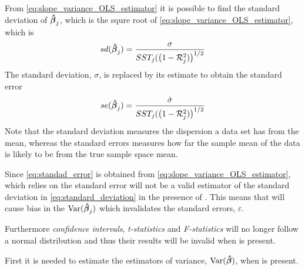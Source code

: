 From \eqref{eq:slope_variance_OLS_estimator} it is possible to find the standard deviation of $\operatorname{\boldsymbol{\hat{\beta}}}_j$, which is the squre root of \ref{eq:slope_variance_OLS_estimator}, which is
\begin{align}\label{eq:standard_deviation}
    sd(\operatorname{\boldsymbol{\hat{\beta}}}_j) = \dfrac{\sigma}{SST_j(\big(1- \mathcal{R}_j^2)\big)^{1/2}}
\end{align}
The standard deviation, $\sigma$, is replaced by its estimate to obtain the standard error
\begin{align}\label{eq:standad_error}
    se(\operatorname{\boldsymbol{\hat{\beta}}}_j) = \dfrac{\hat{\sigma}}{SST_j(\big(1- \mathcal{R}_j^2)\big)^{1/2}}
\end{align}
Note that the standard deviation measures the dispersion a data set has from the mean, whereas the standard errors measures how far the sample mean of the data is likely to be from the true sample space mean. 

Since \eqref{eq:standad_error} is obtained from \eqref{eq:slope_variance_OLS_estimator}, which relies on \homo the standard error will not be a valid estimator of the standard deviation in \eqref{eq:standard_deviation} in the presence of \hetero. This means that \hetero will cause bias in the $\operatorname{\text{Var}}(\operatorname{\boldsymbol{\hat{\beta}}}_j)$ which invalidates the standard errors, $\varepsilon$. 

Furthermore \textit{confidence intervals}, \textit{t-statistics} and \textit{F-statistics} will no longer follow a normal distribution and thus their results will be invalid when \hetero is present. 

First it is needed to estimate the estimators of variance, $\operatorname{\text{Var}}(\operatorname{\boldsymbol{\hat{\beta}}})$, when \hetero is present. 

























